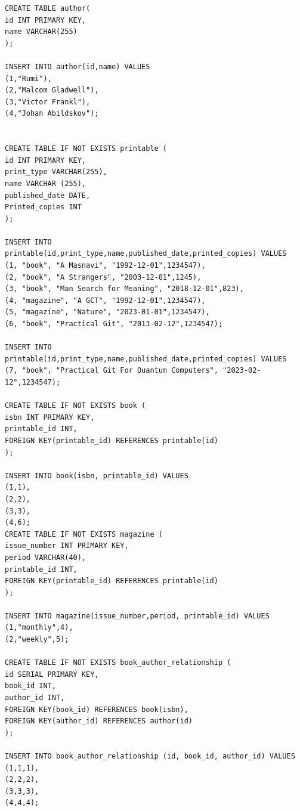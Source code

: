 \documentclass{article}
\begin{document}
\begin{lstlisting}
CREATE TABLE author(
id INT PRIMARY KEY,
name VARCHAR(255)
);

INSERT INTO author(id,name) VALUES
(1,"Rumi"),
(2,"Malcom Gladwell"),
(3,"Victor Frankl"),
(4,"Johan Abildskov");


CREATE TABLE IF NOT EXISTS printable (                                     
id INT PRIMARY KEY,                                                        
print_type VARCHAR(255),                                                   
name VARCHAR (255),                                                        
published_date DATE,                                                       
Printed_copies INT                                                       
);

INSERT INTO printable(id,print_type,name,published_date,printed_copies) VALUES
(1, "book", "A Masnavi", "1992-12-01",1234547),
(2, "book", "A Strangers", "2003-12-01",1245),
(3, "book", "Man Search for Meaning", "2018-12-01",823),
(4, "magazine", "A GCT", "1992-12-01",1234547),
(5, "magazine", "Nature", "2023-01-01",1234547),
(6, "book", "Practical Git", "2013-02-12",1234547);

INSERT INTO printable(id,print_type,name,published_date,printed_copies) VALUES
(7, "book", "Practical Git For Quantum Computers", "2023-02-12",1234547);

CREATE TABLE IF NOT EXISTS book (                                          
isbn INT PRIMARY KEY,    
printable_id INT,
FOREIGN KEY(printable_id) REFERENCES printable(id)                         
);  

INSERT INTO book(isbn, printable_id) VALUES
(1,1),
(2,2),
(3,3),
(4,6);
CREATE TABLE IF NOT EXISTS magazine (                                      
issue_number INT PRIMARY KEY,                                              
period VARCHAR(40),
printable_id INT,
FOREIGN KEY(printable_id) REFERENCES printable(id)                         
);

INSERT INTO magazine(issue_number,period, printable_id) VALUES 
(1,"monthly",4),
(2,"weekly",5);

CREATE TABLE IF NOT EXISTS book_author_relationship (
id SERIAL PRIMARY KEY,
book_id INT,
author_id INT,
FOREIGN KEY(book_id) REFERENCES book(isbn),                                
FOREIGN KEY(author_id) REFERENCES author(id)                           
);

INSERT INTO book_author_relationship (id, book_id, author_id) VALUES 
(1,1,1),
(2,2,2),
(3,3,3),
(4,4,4);


\end{lstlisting}
\end{document}
